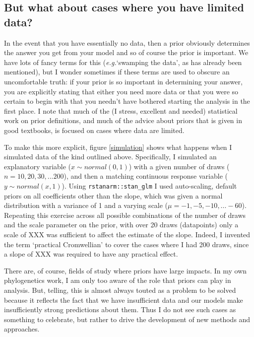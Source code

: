 \documentclass[12pt]{report}
\newcommand{\eg}{\emph{e.g.}\xspace}
\begin{document}
\subsection*{But what about cases where you have limited data?}
In the event that you have essentially no data, then a prior obviously determines the answer you get from your model and so of course the prior is important. We have lots of fancy terms for this (\eg `swamping the data', as has already been mentioned), but I wonder sometimes if these terms are used to obscure an uncomfortable truth: if your prior is so important in determining your answer, you are explicitly stating that either you need more data or that you were so certain to begin with that you needn't have bothered starting the analysis in the first place. I note that much of the (I stress, excellent and needed) statistical work on prior definitions, and much of the advice about priors that is given in good textbooks, is focused on cases where data are limited.

To make this more explicit, figure \ref{simulation} shows what happens when I simulated data of the kind outlined above. Specifically, I simulated an explanatory variable ($x \sim normal(0,1)$) with a given number of draws ($n = 10, 20, 30, ... 200$), and then a matching continuous response variable ($y \sim normal(x, 1)$). Using \texttt{rstanarm::stan\_glm} I used auto-scaling, default priors on all coefficients other than the slope, which was given a normal distribution with a variance of 1 and a varying scale ($\mu = -1, -5, -10, ... -60$). Repeating this exercise across all possible combinations of the number of draws and the scale parameter on the prior, with over 20 draws (datapoints) only a scale of XXX was sufficient to affect the estimate of the slope. Indeed, I invented the term `practical Cromwellian' to cover the cases where I had 200 draws, since a slope of XXX was required to have any practical effect.

There are, of course, fields of study where priors have large impacts. In my own phylogenetics work, I am only too aware of the role that priors can play in analysis. But, telling, this is almost always touted as a problem to be solved because it reflects the fact that we have insufficient data and our models make insufficiently strong predictions about them. Thus I do not see such cases as something to celebrate, but rather to drive the development of new methods and approaches.
\end{document}
